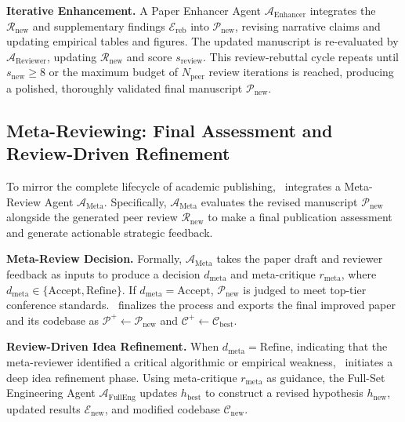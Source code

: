 \noindent\textbf{Iterative Enhancement.}
A Paper Enhancer Agent $\mathcal{A}_{\mathrm{Enhancer}}$ integrates the $\mathcal{R}_{\mathrm{new}}$ and supplementary findings $\mathcal{E}_{\mathrm{reb}}$ into $\mathcal{P}_{\mathrm{new}}$, revising narrative claims and updating empirical tables and figures.
The updated manuscript is re-evaluated by $\mathcal{A}_{\mathrm{Reviewer}}$, updating $\mathcal{R}_{\mathrm{new}}$ and score $s_\mathrm{review}$.
This review-rebuttal cycle repeats until $s_\mathrm{new} \ge 8$ or the maximum budget of $N_{\mathrm{peer}}$ review iterations is reached, producing a polished, thoroughly validated final manuscript $\mathcal{P}_{\mathrm{new}}$.

\subsection{Meta-Reviewing: Final Assessment and Review-Driven Refinement}\label{subsec:meta-reviewing}
To mirror the complete lifecycle of academic publishing, \sname~integrates a Meta-Review Agent $\mathcal{A}_{\mathrm{Meta}}$. Specifically, $\mathcal{A}_{\mathrm{Meta}}$ evaluates the revised manuscript $\mathcal{P}_{\mathrm{new}}$ alongside the generated peer review $\mathcal{R}_{\mathrm{new}}$ to make a final publication assessment and generate actionable strategic feedback.

\noindent\textbf{Meta-Review Decision.}
Formally, $\mathcal{A}_{\mathrm{Meta}}$ takes the paper draft and reviewer feedback as inputs to produce a decision $d_{\mathrm{meta}}$ and meta-critique $r_{\mathrm{meta}}$, where $d_{\mathrm{meta}}\in \{\mathrm{Accept}, \mathrm{Refine}\}$.
If $d_{\mathrm{meta}} = \mathrm{Accept}$, $\mathcal{P}_{\mathrm{new}}$ is judged to meet top-tier conference standards.
\sname~finalizes the process and exports the final improved paper and its codebase as $\mathcal{P}^+ \leftarrow \mathcal{P}_{\mathrm{new}}$ and $\mathcal{C}^+ \leftarrow \mathcal{C}_{\mathrm{best}}$.

\noindent\textbf{Review-Driven Idea Refinement.}
When $d_{\mathrm{meta}} = \mathrm{Refine}$, indicating that the meta-reviewer identified a critical algorithmic or empirical weakness, \sname~initiates a deep idea refinement phase.
Using meta-critique $r_{\mathrm{meta}}$ as guidance, the Full-Set Engineering Agent $\mathcal{A}_{\mathrm{FullEng}}$ updates $h_{\mathrm{best}}$ to construct a revised hypothesis $h_{\mathrm{new}}$, updated results $\mathcal{E}_{\mathrm{new}}$, and modified codebase $\mathcal{C}_{\mathrm{new}}$.

